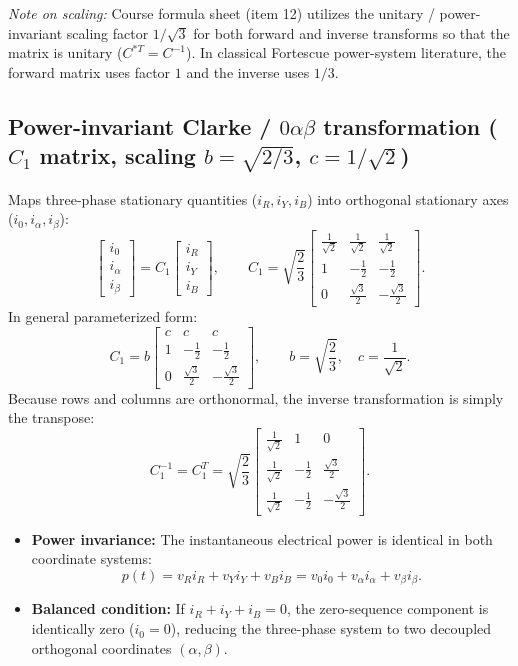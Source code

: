 \emph{Note on scaling:} Course formula sheet (item 12) utilizes the unitary / power-invariant scaling factor \(1/\sqrt{3}\) for both forward and inverse transforms so that the matrix is unitary (\(C^{*T} = C^{-1}\)). In classical Fortescue power-system literature, the forward matrix uses factor \(1\) and the inverse uses \(1/3\).

\subsection{Power-invariant Clarke / \texorpdfstring{$0\alpha\beta$}{0alpha-beta} transformation (\texorpdfstring{$C_1$}{C1} matrix, scaling \texorpdfstring{$b=\sqrt{2/3}$}{b=sqrt(2/3)}, \texorpdfstring{$c=1/\sqrt{2}$}{c=1/sqrt(2)})}
Maps three-phase stationary quantities (\(i_R, i_Y, i_B\)) into orthogonal stationary axes (\(i_0, i_\alpha, i_\beta\)):
\[
\begin{bmatrix}i_0\\i_\alpha\\i_\beta\end{bmatrix}
= C_1
\begin{bmatrix}i_R\\i_Y\\i_B\end{bmatrix},
\qquad
C_1 = \sqrt{\frac{2}{3}}
\begin{bmatrix}
\frac{1}{\sqrt{2}}&\frac{1}{\sqrt{2}}&\frac{1}{\sqrt{2}}\\[6pt]
1&-\frac{1}{2}&-\frac{1}{2}\\[6pt]
0&\frac{\sqrt{3}}{2}&-\frac{\sqrt{3}}{2}
\end{bmatrix}.
\]
In general parameterized form:
\[
C_1 = b
\begin{bmatrix}
c&c&c\\[4pt]
1&-\frac{1}{2}&-\frac{1}{2}\\[4pt]
0&\frac{\sqrt{3}}{2}&-\frac{\sqrt{3}}{2}
\end{bmatrix},
\qquad
b = \sqrt{\frac{2}{3}},\quad c = \frac{1}{\sqrt{2}}.
\]
Because rows and columns are orthonormal, the inverse transformation is simply the transpose:
\[
C_1^{-1} = C_1^T = \sqrt{\frac{2}{3}}
\begin{bmatrix}
\frac{1}{\sqrt{2}}&1&0\\[6pt]
\frac{1}{\sqrt{2}}&-\frac{1}{2}&\frac{\sqrt{3}}{2}\\[6pt]
\frac{1}{\sqrt{2}}&-\frac{1}{2}&-\frac{\sqrt{3}}{2}
\end{bmatrix}.
\]
\begin{itemize}
  \item \textbf{Power invariance:} The instantaneous electrical power is identical in both coordinate systems:
  \[
  p(t) = v_R i_R + v_Y i_Y + v_B i_B = v_0 i_0 + v_\alpha i_\alpha + v_\beta i_\beta.
  \]
  \item \textbf{Balanced condition:} If \(i_R + i_Y + i_B = 0\), the zero-sequence component is identically zero (\(i_0 = 0\)), reducing the three-phase system to two decoupled orthogonal coordinates \((\alpha, \beta)\).
\end{itemize}

